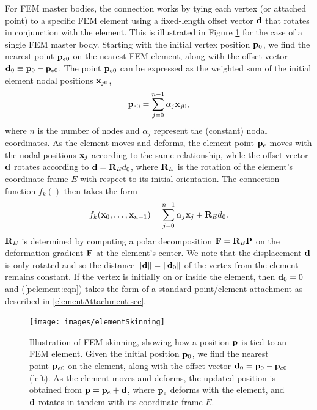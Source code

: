 For FEM master bodies, the connection works by tying each vertex (or
attached point) to a specific FEM element using a fixed-length offset
vector ${\bf d}$ that rotates in conjunction with the element. This is
illustrated in Figure \ref{elementSkinning:fig} for the case of a
single FEM master body. Starting with the initial vertex position
${\bf p}_0$, we find the nearest point ${\bf p}_{e0}$ on the nearest FEM
element, along with the offset vector ${\bf d}_0 \equiv {\bf p}_0 -
{\bf p}_{e0}$. The point ${\bf p}_{e0}$ can be expressed as the weighted
sum of the initial element nodal positions ${\bf x}_{j0}$,
%
\begin{equation}
{\bf p}_{e0} = \sum_{j=0}^{n-1} \alpha_j {\bf x}_{j0},
\end{equation}
%
where $n$ is the number of nodes and $\alpha_j$ represent the
(constant) nodal coordinates. As the element moves and deforms, the
element point ${\bf p}_e$ moves with the nodal positions ${\bf x}_j$ according
to the same relationship, while the offset vector ${\bf d}$ rotates
according to ${\bf d} = {\bf R}_E d_0$, where ${\bf R}_E$ is the rotation of the
element's coordinate frame $E$ with respect to its initial
orientation.  The connection function $f_k()$ then takes the form
%
\begin{equation}
f_k ({\bf x}_0, \ldots, {\bf x}_{n-1}) =
\sum_{j=0}^{n-1} \alpha_j {\bf x}_j + {\bf R}_E d_0.
\label{pelement:eqn}
\end{equation}
%
${\bf R}_E$ is determined by computing a polar decomposition ${\bf F} = {\bf R}_E {\bf P}$
on the deformation gradient ${\bf F}$ at the element's center. We note that
the displacement ${\bf d}$ is only rotated and so the distance $\|{\bf d}\| =
\|{\bf d}_0\|$ of the vertex from the element remains constant. If the
vertex is initially on or inside the element, then ${\bf d}_0 = 0$ and
(\ref{pelement:eqn}) takes the form of a standard point/element
attachment as described in \ref{elementAttachment:sec}.

\begin{figure}[ht]
\begin{center}
 \texttt{[image: images/elementSkinning]}
\end{center}
\caption{Illustration of FEM skinning, showing how a position ${\bf p}$ is
tied to an FEM element.  Given the initial position ${\bf p}_0$, we find
the nearest point ${\bf p}_{e0}$ on the element, along with the offset
vector ${\bf d}_0 = {\bf p}_0 - {\bf p}_{e0}$ (left).  As the element moves and
deforms, the updated position is obtained from ${\bf p} = {\bf p}_e + {\bf d}$, where ${\bf p}_e$
deforms with the element, and ${\bf d}$ rotates in tandem with its
coordinate frame $E$.}
\label{elementSkinning:fig}
\end{figure}

